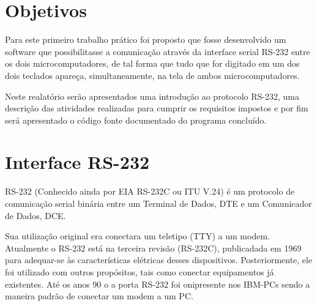 \documentclass[brazil,times,12pt]{abnt}
\begin{document}





\data{\today}

\capa

\folhaderosto

\section*{Objetivos}
	Para este primeiro trabalho prático foi proposto que fosse desenvolvido um
	software que possibilitasse a comunicação através da interface serial RS-232
	entre os dois microcomputadores, de tal forma que tudo que for digitado em um
	dos dois teclados apareça, simultaneamente, na tela de ambos microcomputadores.
	
	Neste realatório serão apresentados uma introdução ao protocolo RS-232, uma
	descrição das atividades realizadas para cumprir os requisitos impostos e por
	fim será apresentado o código fonte documentado do programa concluído.
	
\section*{Interface RS-232}
	RS-232 (Conhecido ainda por EIA RS-232C ou ITU V.24) é um protocolo de
	comunicação serial binária entre um Terminal de Dados, DTE e um Comunicador de
	Dados, DCE. \cite{wiki:rs232}

	Sua utilização original era conectara um teletipo (TTY) a um modem. Atualmente
	o RS-232 está na terceira revisão (RS-232C), publicadada em 1969 para
	adequar-se às características elétricas desses dispositivos. Posteriormente,
	ele foi utilizado com outros propósitos, tais como conectar equipamentos já
	existentes. Até os anos 90 o a porta RS-232 foi onipresente nos IBM-PCs sendo a
	maneira padrão de conectar um modem a um PC.
	
\end{document}
